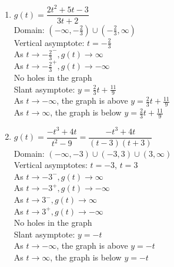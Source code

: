\begin{multicols}{2}
\begin{enumerate}
\setcounter{enumi}{\value{HW}}

\item $g(t) = \dfrac{2t^{2} + 5t - 3}{3t + 2}$\\
Domain: $\left(-\infty, -\frac{2}{3}\right) \cup \left(-\frac{2}{3}, \infty\right)$\\
Vertical asymptote: $t = -\frac{2}{3}$\\
As $t \rightarrow -\frac{2}{3}^{-}, g(t) \rightarrow \infty$\\
As $t \rightarrow -\frac{2}{3}^{+}, g(t) \rightarrow -\infty$\\
No holes in the graph \\
Slant asymptote:  $y = \frac{2}{3}t + \frac{11}{9}$ \\
As $t \rightarrow  -\infty$, the graph is above \small $y = \frac{2}{3}t + \frac{11}{9}$\\
\normalsize As $t \rightarrow \infty$, the graph is below \small $y = \frac{2}{3}t + \frac{11}{9}$ \normalsize \\

\vfill

\columnbreak

\item $g(t) = \dfrac{-t^{3} + 4t}{t^{2} - 9} = \dfrac{-t^{3} + 4t}{(t-3)(t+3)} $\\
Domain: $(-\infty, -3) \cup (-3, 3) \cup (3, \infty)$\\
Vertical asymptotes: $t = -3$, $t=3$\\
As $t \rightarrow -3^{-}, g(t) \rightarrow \infty$\\
As $t \rightarrow -3^{+}, g(t) \rightarrow -\infty$\\
As $t \rightarrow 3^{-}, g(t) \rightarrow \infty$\\
As $t \rightarrow 3^{+}, g(t) \rightarrow -\infty$\\
No holes in the graph \\
Slant asymptote: $y=-t$ \\
As $t \rightarrow -\infty$, the graph is above $y=-t$\\
As $t \rightarrow \infty$, the graph is below $y=-t$\\


\setcounter{HW}{\value{enumi}}
\end{enumerate}
\end{multicols}

